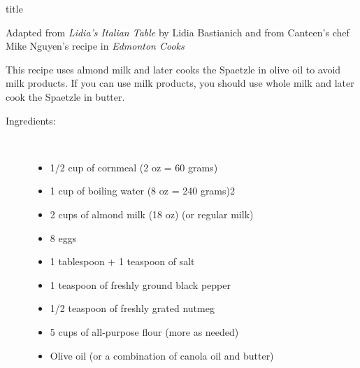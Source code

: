 \documentclass [11pt, letterpaper] {article}
\begin{document}
 {title}

\begin {flushright}
{Adapted from {\it Lidia's Italian Table} by Lidia Bastianich and from Canteen's chef Mike Nguyen's recipe in {\it Edmonton Cooks} }
\end {flushright}

This recipe uses almond milk and later cooks the Spaetzle in olive oil to avoid milk products. If you can use milk products, you should use whole milk and later cook the Spaetzle in butter.

\vspace{0.3in}
\begin{description}

\item[Ingredients:]\ \\
	\begin{itemize}
	\item 1/2 cup of cornmeal (2 oz = 60 grams)
	\item 1 cup of boiling water (8 oz = 240 grams)2 
	\item 2 cups of almond milk (18 oz) (or regular milk)
	\item 8 eggs
	\item 1 tablespoon + 1 teaspoon of salt
	\item 1 teaspoon of freshly ground black pepper
	\item 1/2 teaspoon of freshly grated nutmeg
	\item	5 cups of all-purpose flour (more as needed)
	\item Olive oil (or a combination of canola oil and butter)
	\end{itemize}


\end{description}
\end{document}
